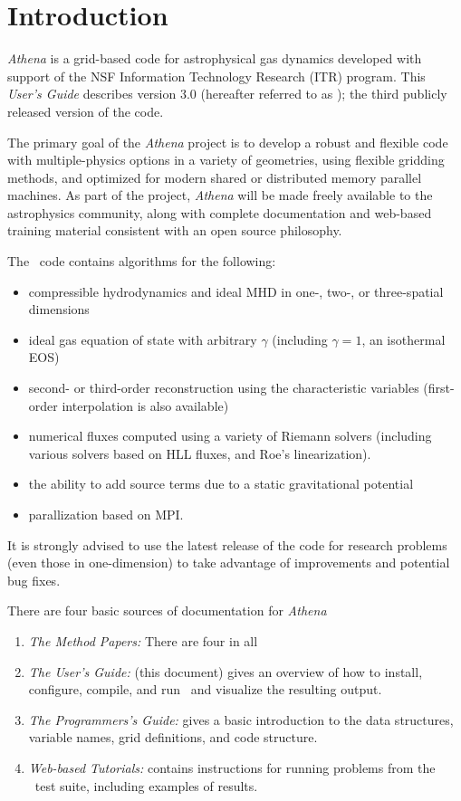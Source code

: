 \section{Introduction}

{\it Athena} is a grid-based code for astrophysical gas dynamics
developed with support of the NSF Information Technology Research (ITR)
program.  This {\it User's Guide} describes version 3.0 (hereafter
referred to as \ath); the third publicly released version of the code.

The primary goal of the {\it Athena} project is to develop a robust and
flexible code with multiple-physics options in a variety of geometries,
using flexible gridding methods, and optimized for modern shared or
distributed memory parallel machines.  As part of the project, {\it Athena}
will be made freely available to the astrophysics community, along with
complete documentation and web-based training material consistent with
an open source philosophy.

The \ath\ code contains algorithms for
the following:
\begin{itemize}
\item compressible hydrodynamics and ideal MHD in one-, two-, or three-spatial dimensions
\item ideal gas equation of state with arbitrary $\gamma$ (including 
$\gamma = 1$, an isothermal EOS)
\item second- or third-order reconstruction using the characteristic variables
(first-order interpolation is also available)
\item numerical fluxes computed using a variety of Riemann solvers (including
various solvers based on HLL fluxes, and Roe's linearization).
\item the ability to add source terms due to a static gravitational potential
\item parallization based on MPI.
\end{itemize}
It is strongly advised to use the latest release of
the code for research problems (even those in one-dimension) to take
advantage of improvements and potential bug fixes.

There are four basic sources of documentation for {\it Athena}
\begin{enumerate}
\item {\it The Method Papers:} There are four in all
\item {\it The User's Guide:} (this document) gives an overview of how to
install, configure, compile, and run \ath\ and visualize the resulting output.
\item {\it The Programmers's Guide:} gives a basic introduction to the 
data structures, variable names, grid definitions, and code structure.
\item {\it Web-based Tutorials:} contains instructions
for running problems from the \ath\ test suite, including examples of results.
\end{enumerate}

